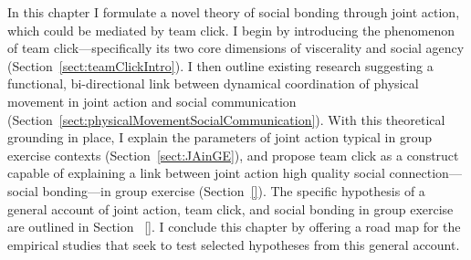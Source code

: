 \begin{CJK}{UTF8}{gbsn}
In this chapter I formulate a novel theory of social bonding through joint action, which could be mediated by team click.  I begin by introducing the phenomenon of team click---specifically its two core dimensions of viscerality and social agency (Section~\ref{sect:teamClickIntro}).  I then outline existing research suggesting a functional, bi-directional link between dynamical coordination of physical movement in joint action and social communication (Section~\ref{sect:physicalMovementSocialCommunication}).  With this theoretical grounding in place, I explain the parameters of joint action typical in group exercise contexts (Section~\ref{sect:JAinGE}), and propose team click as a construct capable of explaining a link between joint action high quality social connection---social bonding---in group exercise (Section~\ref{}).  The specific hypothesis of a general account of joint action, team click, and social bonding in group exercise are outlined in Section ~\ref{}.  I conclude this chapter by offering a road map for the  empirical studies that seek to test selected hypotheses from this general account.




\end{CJK}
